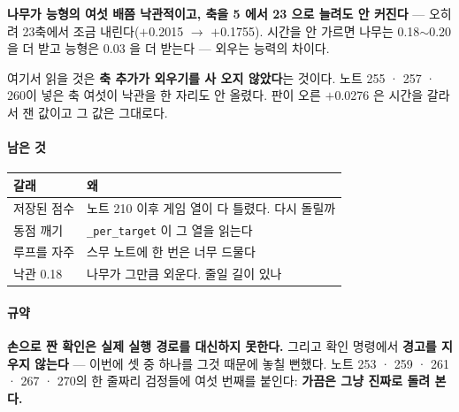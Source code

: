 \documentclass[10pt]{article}
\begin{document}
\textbf{나무가 능형의 여섯 배쯤 낙관적이고, 축을 5 에서 23 으로 늘려도 안
커진다} --- 오히려 23축에서 조금 내린다($+$0.2015 $\to$ $+$0.1755). 시간을
안 가르면 나무는 0.18$\sim$0.20 을 더 받고 능형은 0.03 을 더 받는다 ---
외우는 능력의 차이다.

여기서 읽을 것은 \textbf{축 추가가 외우기를 사 오지 않았다}는 것이다. 노트
255 · 257 · 260이 넣은 축 여섯이 낙관을 한 자리도 안 올렸다. 판이 오른
$+$0.0276 은 시간을 갈라서 잰 값이고 그 값은 그대로다.

\paragraph{남은 것}
\begin{center}\small
\begin{tabular}{ll}
\hline
갈래 & 왜 \\
\hline
저장된 점수 & 노트 210 이후 게임 열이 다 틀렸다. 다시 돌릴까 \\
동점 깨기 & \texttt{\_per\_target} 이 그 열을 읽는다 \\
루프를 자주 & 스무 노트에 한 번은 너무 드물다 \\
낙관 0.18 & 나무가 그만큼 외운다. 줄일 길이 있나 \\
\hline
\end{tabular}
\end{center}

\paragraph{규약} \textbf{손으로 짠 확인은 실제 실행 경로를 대신하지 못한다.}
그리고 확인 명령에서 \textbf{경고를 지우지 않는다} --- 이번에 셋 중 하나를
그것 때문에 놓칠 뻔했다. 노트 253 · 259 · 261 · 267 · 270의 한 줄짜리
검정들에 여섯 번째를 붙인다: \textbf{가끔은 그냥 진짜로 돌려 본다.}
\end{document}
